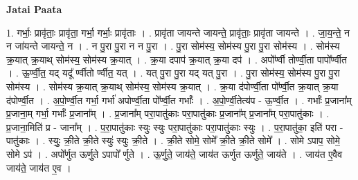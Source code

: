 \documentclass[17pt]{extarticle}
\begin{document}
\textbf{Jatai Paata} \newline

1. गर्भाः॒ प्रावृ॑ताः॒ प्रावृ॑ता॒ गर्भा॒ गर्भाः॒ प्रावृ॑ताः । . प्रावृ॑ता जायन्ते जायन्ते॒ प्रावृ॑ताः॒ प्रावृ॑ता जायन्ते । . जा॒य॒न्ते॒ न न जा॑यन्ते जायन्ते॒ न । . न पु॒रा पु॒रा न न पु॒रा । . पु॒रा सोम॑स्य॒ सोम॑स्य पु॒रा पु॒रा सोम॑स्य । . सोम॑स्य क्र॒यात् क्र॒याथ् सोम॑स्य॒ सोम॑स्य क्र॒यात् । . क्र॒या दपाप॑ क्र॒यात् क्र॒या दप॑ । . अपो᳚र्ण्वी तोर्ण्वी॒ता पापो᳚र्ण्वीत । . ऊ॒र्ण्वी॒त॒ यद् यदू᳚ र्ण्वीतो र्ण्वीत॒ यत् । . यत् पु॒रा पु॒रा यद् यत् पु॒रा । . पु॒रा सोम॑स्य॒ सोम॑स्य पु॒रा पु॒रा सोम॑स्य । . सोम॑स्य क्र॒यात् क्र॒याथ् सोम॑स्य॒ सोम॑स्य क्र॒यात् । . क्र॒या द॑पोर्ण्वी॒ता पो᳚र्ण्वी॒त क्र॒यात् क्र॒या द॑पोर्ण्वी॒त । . अ॒पो॒र्ण्वी॒त गर्भा॒ गर्भा॑ अपोर्ण्वी॒ता पो᳚र्ण्वी॒त गर्भाः᳚ । . अ॒पो॒र्ण्वी॒तेत्य॑प - ऊ॒र्ण्वी॒त । . गर्भाः᳚ प्र॒जाना᳚म् प्र॒जाना॒म् गर्भा॒ गर्भाः᳚ प्र॒जाना᳚म् । . प्र॒जाना᳚म् परा॒पातु॑काः परा॒पातु॑काः प्र॒जाना᳚म् प्र॒जाना᳚म् परा॒पातु॑काः । . प्र॒जाना॒मिति॑ प्र - जाना᳚म् । . प॒रा॒पातु॑काः स्युः स्युः परा॒पातु॑काः परा॒पातु॑काः स्युः । . प॒रा॒पातु॑का॒ इति॑ परा - पातु॑काः । . स्युः॒ क्री॒ते क्री॒ते स्युः॑ स्युः क्री॒ते । . क्री॒ते सोमे॒ सोमे᳚ क्री॒ते क्री॒ते सोमे᳚ । . सोमे ऽपाप॒ सोमे॒ सोमे ऽप॑ । . अपो᳚र्णुत ऊर्णु॒ते ऽपापो᳚ र्णुते । . ऊ॒र्णु॒ते॒ जाय॑ते॒ जाय॑त ऊर्णुत ऊर्णुते॒ जाय॑ते । . जाय॑त ए॒वैव जाय॑ते॒ जाय॑त ए॒व । \newline
\end{document}
